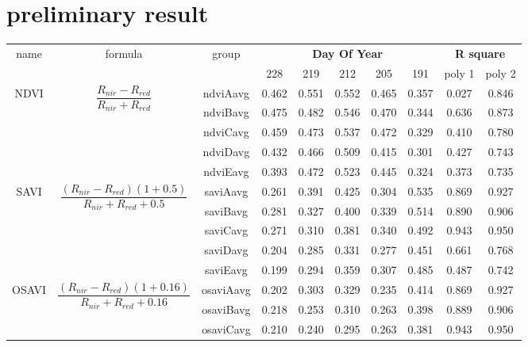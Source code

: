 

\chapter{preliminary result}

\setlength{\arrayrulewidth}{50mm}
\setlength{\tabcolsep}{10pt}
\renewcommand{\arraystretch}{1.1}
\setlength{\arrayrulewidth}{0.7mm}
\begin{center}
\centering
\footnotesize\setlength{\tabcolsep}{1.5pt}
\begin{tabular}{|c|c|c|ccccc|cc|}
\hline
\multirow{2}{3em}{name} & \multirow{2}{6em}{formula} & \multirow{2}{3em}{group} &
\multicolumn{5}{c|}{\bfseries Day Of Year} & \multicolumn{2}{c|}{\bfseries R square} \\
\cline{4-10}
&&& 228 & 219 & 212 & 205 & 191 & poly 1 & poly 2\\
\hline
\multirow{5}{40pt}{NDVI} & \multirow{5}{105pt}{ \[\frac{R_{nir} - R _{red}}{R_{nir} + R _{red}}\]}
  & ndviAavg & 0.462 & 0.551 & 0.552 & 0.465 & 0.357 & 0.027 & 0.846\\
 && ndviBavg & 0.475 & 0.482 & 0.546 & 0.470 & 0.344 & 0.636 & 0.873\\
 && ndviCavg & 0.459 & 0.473 & 0.537 & 0.472 & 0.329 & 0.410 & 0.780\\
 && ndviDavg & 0.432 & 0.466 & 0.509 & 0.415 & 0.301 & 0.427 & 0.743\\
 && ndviEavg & 0.393 & 0.472 & 0.523 & 0.445 & 0.324 & 0.373 & 0.735\\
 \hline
\multirow{5}{40pt}{SAVI} & \multirow{5}{105pt}{ \[\frac{(R_{nir} - R _{red})(1+0.5)}{R_{nir} + R _{red} + 0.5}\]}
  & saviAavg & 0.261 & 0.391 & 0.425 & 0.304 & 0.535 & 0.869 & 0.927\\
 && saviBavg & 0.281 & 0.327 & 0.400 & 0.339 & 0.514 & 0.890 & 0.906\\
 && saviCavg & 0.271 & 0.310 & 0.381 & 0.340 & 0.492 & 0.943 & 0.950\\
 && saviDavg & 0.204 & 0.285 & 0.331 & 0.277 & 0.451 & 0.661 & 0.768\\
 && saviEavg & 0.199 & 0.294 & 0.359 & 0.307 & 0.485 & 0.487 & 0.742\\
\hline
\multirow{5}{40pt}{OSAVI} & \multirow{5}{105pt}{ \[\frac{(R_{nir} - R _{red})(1+0.16)}{R_{nir} + R _{red} + 0.16}\]}
  & osaviAavg & 0.202 & 0.303 & 0.329 & 0.235 & 0.414 & 0.869 & 0.927\\
 && osaviBavg & 0.218 & 0.253 & 0.310 & 0.263 & 0.398 & 0.889 & 0.906\\
 && osaviCavg & 0.210 & 0.240 & 0.295 & 0.263 & 0.381 & 0.943 & 0.950\\

\end{tabular}
\end{center}
